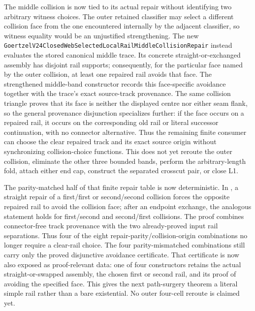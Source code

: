 \documentclass[11pt]{article}
\theoremstyle{definition}
\begin{document}
The middle collision is now tied to its actual repair without identifying two
arbitrary witness choices.  The outer retained classifier may select a
different collision face from the one encountered internally by the adjacent
classifier, so witness equality would be an unjustified strengthening.  The
new
\texttt{GoertzelV24ClosedWebSelectedLocalRailMiddleCollisionRepair}
instead evaluates the stored canonical middle trace.  Its concrete
straight-or-exchanged assembly has disjoint rail supports; consequently, for
the particular face named by the outer collision, at least one repaired rail
avoids that face.  The strengthened middle-band constructor records this
face-specific avoidance together with the trace's exact source-track
provenance.  The same collision triangle proves that its face is neither the
displayed centre nor either seam flank, so the general provenance disjunction
specializes further: if the face occurs on a repaired rail, it occurs on the
corresponding old rail or literal successor continuation, with no connector
alternative.  Thus the remaining finite consumer can choose the clear
repaired track and its exact source origin without synchronizing
collision-choice functions.  This does not yet
reroute the outer collision, eliminate the other three bounded bands, perform
the arbitrary-length fold, attach either end cap, construct the separated
crosscut pair, or close L1.

The parity-matched half of that finite repair table is now deterministic.
In
,
a straight repair of a first/first or second/second collision forces the
opposite repaired rail to avoid the collision face; after an endpoint
exchange, the analogous statement holds for first/second and second/first
collisions.  The proof combines connector-free track provenance with the two
already-proved input rail separations.  Thus four of the eight
repair-parity/collision-origin combinations no longer require a clear-rail
choice.  The four parity-mismatched combinations still carry only the proved
disjunctive avoidance certificate.  That certificate is now also exposed as
proof-relevant data: one of four constructors retains the actual
straight-or-swapped assembly, the chosen first or second rail, and its proof
of avoiding the specified face.  This gives the next path-surgery theorem a
literal simple rail rather than a bare existential.  No outer four-cell
reroute is claimed yet.
\end{document}
